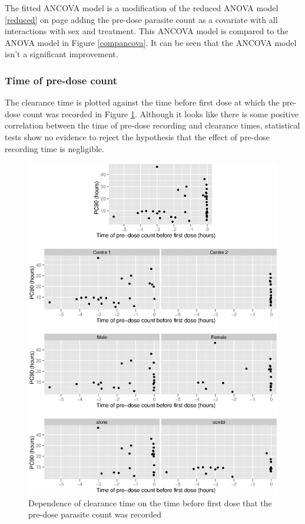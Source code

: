 The fitted ANCOVA model is a modification of the reduced ANOVA model \ref{reduced} on page \pageref{reduced} adding the pre-dose parasite count as a covariate with all interactions with sex and treatment. This ANCOVA model is compared to the ANOVA model in Figure \ref{compancova}. It can be seen that the ANCOVA model isn't a significant improvement.

\subsubsection*{Time of pre-dose count}\label{sec:pretimeancova}
The clearance time is plotted against the time before first dose at which the pre-dose count was recorded in Figure \ref{pretime-ancova}. Although it looks like there is some positive correlation between the time of pre-dose recording and clearance times, statistical tests show no evidence to reject the hypothesis that the effect of pre-dose recording time is negligible.
\begin{figure}[p]
\includegraphics[width=150mm]{pretime-ancova.eps} 
\caption{Dependence of clearance time on the time before first dose that the pre-dose parasite count was recorded}
\label{pretime-ancova}
\end{figure}

